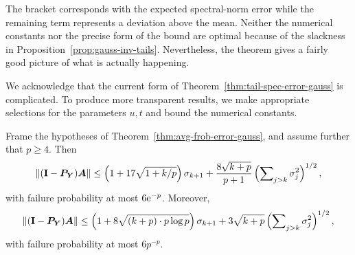 \documentclass[final]{siamltex}
\newcommand{\pgnotate}[1]{{\color{blue}[#1]}}
\begin{document}
\lsp


The bracket corresponds with the expected spectral-norm error while the remaining term represents
a deviation above the mean.  Neither the numerical constants nor the precise form of the bound
are optimal because of the slackness in Proposition~\ref{prop:gauss-inv-tails}.  Nevertheless,
the theorem gives a fairly good picture of what is actually happening.

We acknowledge that the current form of Theorem~\ref{thm:tail-spec-error-gauss} is complicated.
To produce more transparent results, we make appropriate selections for the parameters $u, t$
and bound the numerical constants.

\lsp

\begin{corollary} \label{cor:tail-spec-error-gauss}
Frame the hypotheses of Theorem~\ref{thm:avg-frob-error-gauss}, and assume further that $p \geq 4$.  Then
$$
\left\Vert { (\mathbf{I}- \bm{P}_{\bm{Y}}) \bm{A} } \right\Vert
    \leq \left( 1 + 17 \sqrt{1 + k/p} \right) \sigma_{k+1}
        + \frac{8\sqrt{k+p}}{p+1} \left( \sum\nolimits_{j > k} \sigma_j^2 \right)^{1/2},
$$
with failure probability at most $6\mathrm{e}^{-p}$. Moreover, %
$$
\left\Vert { (\mathbf{I}- \bm{P}_{\bm{Y}}) \bm{A} } \right\Vert
    \leq \left( 1 + 8 \sqrt{(k + p) \cdot p \log p} \right) \sigma_{k+1}
        + 3 \sqrt{k+p} \left( \sum\nolimits_{j > k} \sigma_j^2 \right)^{1/2},
$$
with failure probability at most $6 p^{-p}$.
\end{corollary}


\end{document}
